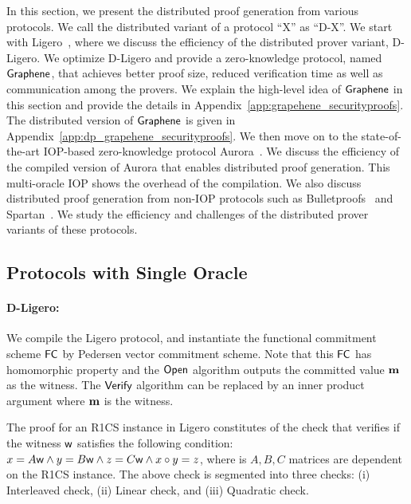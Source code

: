 In this section, we present the distributed proof generation from various protocols. We call the distributed variant of a protocol ``X'' as ``D-X''. We start with Ligero~\cite{ligero}, where we discuss the efficiency of the distributed prover variant, D-Ligero. We optimize D-Ligero and provide a zero-knowledge protocol, named $\textsf{Graphene}$, that achieves better proof size, reduced verification time as well as communication among the provers. We explain the high-level idea of $\textsf{Graphene}$ in this section and provide the details in Appendix~\ref{app:grapehene_securityproofs}. The distributed version of $\textsf{Graphene}$ is given in Appendix~\ref{app:dp_grapehene_securityproofs}.
We then move on to the state-of-the-art IOP-based zero-knowledge protocol Aurora~\cite{aurora}. We discuss the efficiency of the compiled version of Aurora that enables distributed proof generation. This multi-oracle IOP shows the overhead of the compilation. 
We also discuss distributed proof generation from non-IOP protocols such as Bulletproofs~\cite{bulletproofs} and Spartan~\cite{spartan}. We study the efficiency and challenges of the distributed prover variants of these protocols. 


\subsection{Protocols with Single Oracle}
\paragraph*{D-Ligero:}
We compile the Ligero protocol, and instantiate the functional commitment scheme $\mathsf{FC}$ by Pedersen vector commitment scheme. Note that this $\mathsf{FC}$ has homomorphic property and the $\mathsf{Open}$ algorithm outputs the committed value ${\bf m}$ as the witness. The $\mathsf{Verify}$ algorithm can be replaced by an inner product argument where ${\bf m}$ is the witness.

The proof for an R1CS instance in Ligero constitutes of the check that verifies if the witness $\mathsf{w}$ satisfies the following condition: $x = A \mathsf{w} \land y = B \mathsf{w} \land z = C \mathsf{w} \land x \circ y = z$, where is $A, B, C$ matrices are dependent on the R1CS instance. The above check is segmented into three checks: (i) Interleaved check, (ii) Linear check, and (iii) Quadratic check. 

